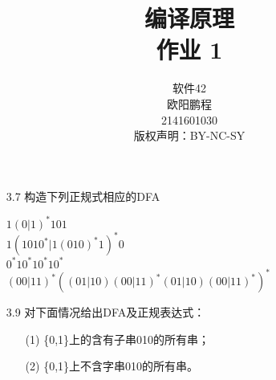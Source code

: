 \documentclass[]{ctexart}
\title{编译原理 \\ 作业 1}
\author{软件42 \\ 欧阳鹏程 \\ 2141601030 \\ 版权声明：BY-NC-SY}
\begin{document}
\maketitle

\begin{enumerate}
	\item[3.7] 构造下列正规式相应的DFA
	\begin{center}
		$1(0|1)^{*}101$ \\
		$1(1010^{*}|1(010)^{*}1)^{*}0$ \\
		$0^{*}10^{*}10^{*}10^{*}$ \\
		$(00|11)^{*}((01|10)(00|11)^{*}(01|10)(00|11)^{*})^{*}$
	\end{center}
	
	
	
	
	
	\item[3.9] 对下面情况给出DFA及正规表达式：
	\begin{enumerate}
		\item[(1)] \{0,1\}上的含有子串010的所有串；
		\item[(2)] \{0,1\}上不含字串010的所有串。
	\end{enumerate}
	
	
	
	

\end{enumerate}
\end{document}
